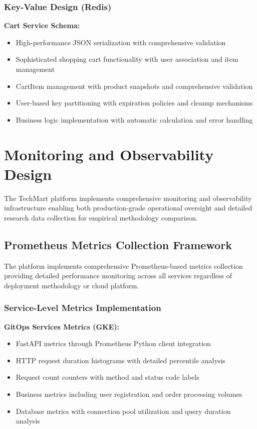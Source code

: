 \subsubsection{Key-Value Design (Redis)}

\textbf{Cart Service Schema:}
\begin{itemize}
\item High-performance JSON serialization with comprehensive validation
\item Sophisticated shopping cart functionality with user association and item management
\item CartItem management with product snapshots and comprehensive validation
\item User-based key partitioning with expiration policies and cleanup mechanisms
\item Business logic implementation with automatic calculation and error handling
\end{itemize}

\section{Monitoring and Observability Design}

The TechMart platform implements comprehensive monitoring and observability infrastructure enabling both production-grade operational oversight and detailed research data collection for empirical methodology comparison.

\subsection{Prometheus Metrics Collection Framework}

The platform implements comprehensive Prometheus-based metrics collection providing detailed performance monitoring across all services regardless of deployment methodology or cloud platform.

\subsubsection{Service-Level Metrics Implementation}

\textbf{GitOps Services Metrics (GKE):}
\begin{itemize}
\item FastAPI metrics through Prometheus Python client integration
\item HTTP request duration histograms with detailed percentile analysis
\item Request count counters with method and status code labels
\item Business metrics including user registration and order processing volumes
\item Database metrics with connection pool utilization and query duration analysis
\end{itemize}

